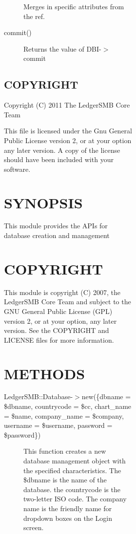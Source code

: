 \begin{description}
\begin{description}
\begin{description}
\begin{description}
\begin{description}
\begin{description}
\begin{description}
Merges in specific attributes from the ref.


\item[{commit()}] \mbox{}

Returns the value of DBI-$>$commit

\end{description}
\subsection*{COPYRIGHT\label{LedgerSMB::File_COPYRIGHT}}


Copyright (C) 2011 The LedgerSMB Core Team



This file is licensed under the Gnu General Public License version 2, or at your
option any later version.  A copy of the license should have been included with
your software.

\section{SYNOPSIS\label{SYNOPSIS}}


This module provides the APIs for database creation and management

\section{COPYRIGHT\label{COPYRIGHT}}


This module is copyright (C) 2007, the LedgerSMB Core Team and subject to 
the GNU General Public License (GPL) version 2, or at your option, any later
version.  See the COPYRIGHT and LICENSE files for more information.

\section{METHODS\label{METHODS}}
\begin{description}

\item[{LedgerSMB::Database-$>$new(\{dbname = \$dbname, countrycode = \$cc, chart\_name = \$name, company\_name = \$company, username = \$username, password = \$password\})}] \mbox{}

This function creates a new database management object with the specified
characteristics.  The \$dbname is the name of the database. the countrycode
is the two-letter ISO code.  The company name is the friendly name for 
dropdown boxes on the Login screen.




\end{description}
\end{description}
\end{description}
\end{description}
\end{description}
\end{description}
\end{description}

